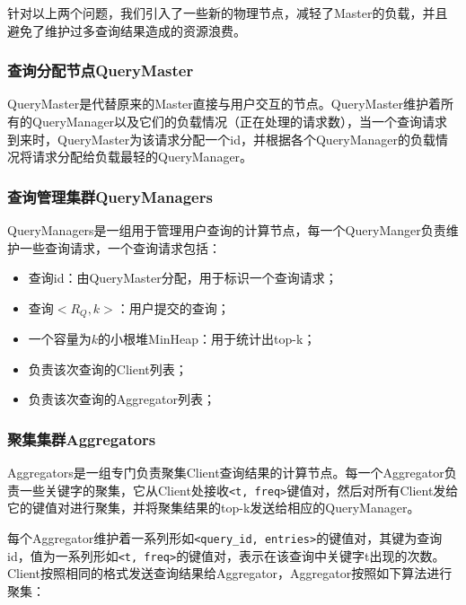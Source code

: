 \documentclass{elegantpaper}
\begin{document}
\noindent 针对以上两个问题，我们引入了一些新的物理节点，减轻了Master的负载，并且避免了维护过多查询结果造成的资源浪费。

\subsubsection{查询分配节点QueryMaster}

QueryMaster是代替原来的Master直接与用户交互的节点。QueryMaster维护着所有的QueryManager以及它们的负载情况（正在处理的请求数），当一个查询请求到来时，QueryMaster为该请求分配一个id，并根据各个QueryManager的负载情况将请求分配给负载最轻的QueryManager。

\subsubsection{查询管理集群QueryManagers}

QueryManagers是一组用于管理用户查询的计算节点，每一个QueryManger负责维护一些查询请求，一个查询请求包括：

\begin{itemize}

    \item 查询id：由QueryMaster分配，用于标识一个查询请求；
    
    \item 查询$<R_Q, k>$：用户提交的查询；
    
    \item 一个容量为$k$的小根堆MinHeap：用于统计出top-k；
    
    \item 负责该次查询的Client列表；
    
    \item 负责该次查询的Aggregator列表；
    
\end{itemize}

\subsubsection{聚集集群Aggregators}

Aggregators是一组专门负责聚集Client查询结果的计算节点。每一个Aggregator负责一些关键字的聚集，它从Client处接收\verb|<t, freq>|键值对，然后对所有Client发给它的键值对进行聚集，并将聚集结果的top-k发送给相应的QueryManager。

\noindent 每个Aggregator维护着一系列形如\verb|<query_id, entries>|的键值对，其键为查询id，值为一系列形如\verb|<t, freq>|的键值对，表示在该查询中关键字t出现的次数。Client按照相同的格式发送查询结果给Aggregator，Aggregator按照如下算法进行聚集：
\end{document}
